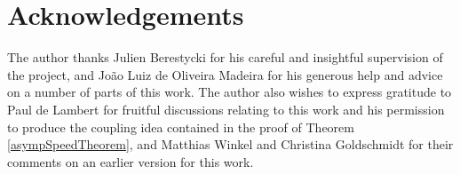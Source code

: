 \documentclass{article}
\begin{document}
\section*{Acknowledgements}
The author thanks Julien Berestycki for his careful and insightful supervision of the project, and Jo\~{a}o Luiz de Oliveira Madeira for his generous help and advice on a number of parts of this work. The author also wishes to express gratitude to Paul de Lambert for fruitful discussions relating to this work and his permission to produce the coupling idea contained in the proof of Theorem \ref{asympSpeedTheorem}, and Matthias Winkel and Christina Goldschmidt for their comments on an earlier version for this work. 



\end{document}
